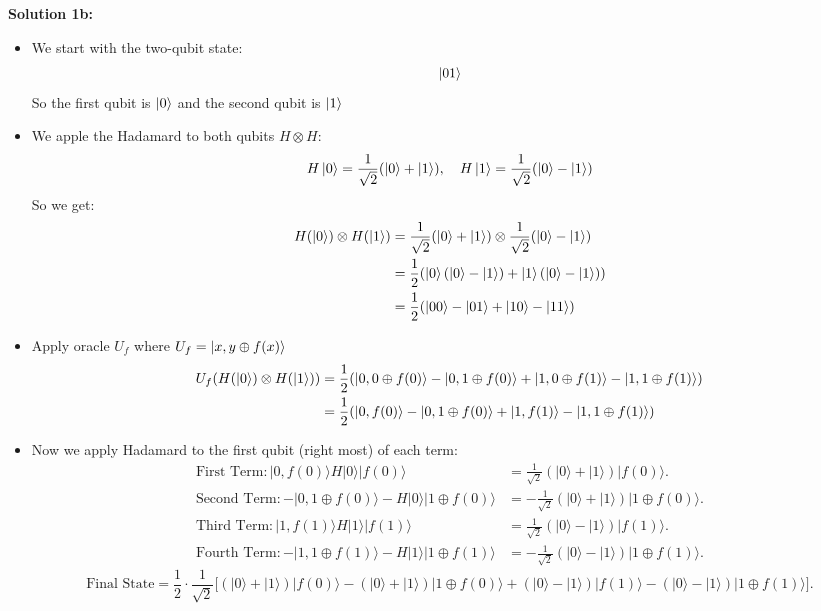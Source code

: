 \documentclass{article}
\begin{document}
\textbf{Solution 1b:}
\begin{itemize}
    \item We start with the two-qubit state: $$\ket{01}$$ So the first qubit is $\ket{0}$ and the second qubit is $\ket{1}$
    \item We apple the Hadamard to both qubits $H \otimes H$: $$H\ket{0}=\frac{1}{\sqrt{2}}(\ket{0}+\ket{1}), \quad H\ket{1}=\frac{1}{\sqrt{2}}(\ket{0}-\ket{1})$$
    So we get: 
    \begin{align*}
        H(\ket{0}) \otimes H(\ket{1}) &=\frac{1}{\sqrt{2}}(\ket{0}+\ket{1})\otimes\frac{1}{\sqrt{2}}(\ket{0}-\ket{1})\\
        &=\frac{1}{2}(\ket{0}(\ket{0}-\ket{1})+\ket{1}(\ket{0}-\ket{1}))\\
        &=\frac{1}{2}(\ket{00}-\ket{01}+\ket{10}-\ket{11})
    \end{align*}
    \item Apply oracle $U_f$ where $U_f=\ket{x,y\oplus f(x)}$
    \begin{align*}
        U_f (H(\ket{0}) \otimes H(\ket{1}))&=\frac{1}{2}(\ket{0,0\oplus f(0)}-\ket{0,1\oplus f(0)}+\ket{1,0\oplus f(1)}-\ket{1,1 \oplus f(1)})\\
        &=\frac{1}{2}(\ket{0,f(0)}-\ket{0,1\oplus f(0)}+\ket{1, f(1)}-\ket{1,1 \oplus f(1)})
    \end{align*}
    \item Now we apply Hadamard to the first qubit (right most) of each term:
    \begin{align*}
    \text{First Term}: |0, f(0)\rangle
    H|0\rangle |f(0)\rangle &= \frac{1}{\sqrt{2}} (|0\rangle + |1\rangle) |f(0)\rangle.\\
    \text{Second Term}: -|0, 1 \oplus f(0)\rangle
   -H|0\rangle |1 \oplus f(0)\rangle &= -\frac{1}{\sqrt{2}} (|0\rangle + |1\rangle) |1 \oplus f(0)\rangle.\\
    \text{Third Term}: |1, f(1)\rangle
   H|1\rangle |f(1)\rangle &= \frac{1}{\sqrt{2}} (|0\rangle - |1\rangle) |f(1)\rangle.\\
    \text{Fourth Term}: -|1, 1 \oplus f(1)\rangle 
   -H|1\rangle |1 \oplus f(1)\rangle &= -\frac{1}{\sqrt{2}} (|0\rangle - |1\rangle) |1 \oplus f(1)\rangle.
    \end{align*}
    $$\text{Final State} =\frac{1}{2} \cdot \frac{1}{\sqrt{2}} \Big[
    (|0\rangle + |1\rangle) |f(0)\rangle - (|0\rangle + |1\rangle) |1 \oplus f(0)\rangle + (|0\rangle - |1\rangle) |f(1)\rangle - (|0\rangle - |1\rangle) |1 \oplus f(1)\rangle\Big].$$\\

\end{itemize}
\end{document}
